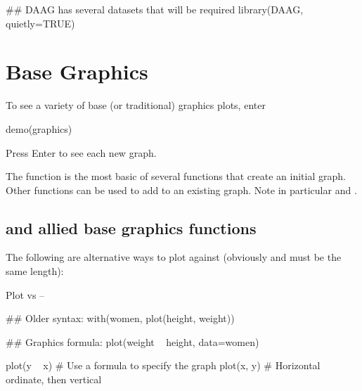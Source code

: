 \begin{Schunk}
\begin{Sinput}
## DAAG has several datasets that will be required
library(DAAG, quietly=TRUE)
\end{Sinput}
\end{Schunk}

\section{Base Graphics}\label{sec:baseplots}

\begin{marginfigure}
  To see a variety of base (or traditional) graphics plots, enter\\[-4pt]
\begin{Schunk}
\begin{Sinput}
demo(graphics)
\end{Sinput}
\end{Schunk}
\noindent Press Enter to see each new graph.
\end{marginfigure}

The function  is the most basic of several functions that
create an initial graph. Other functions can be used to add to an
existing graph. Note in particular   and
.

\subsection{ and allied base graphics functions}
The following are alternative ways to plot  against 
(obviously  and  must be the same length):

\begin{marginfigure}[-3pt]
Plot  vs  --\\
\begin{Schunk}
\begin{Sinput}
## Older syntax:
with(women,
     plot(height, weight))
\end{Sinput}
\end{Schunk}
\begin{Schunk}
\begin{Sinput}
## Graphics formula:
plot(weight ~ height,
     data=women)
\end{Sinput}
\end{Schunk}
\end{marginfigure}
\begin{Schunk}
\begin{Sinput}
plot(y ~ x)   # Use a formula to specify the graph
plot(x, y)    # Horizontal ordinate, then vertical
\end{Sinput}
\end{Schunk}

